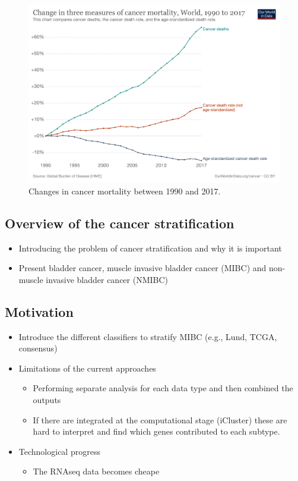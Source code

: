 \begin{figure}[!htb]
    \centering\includegraphics[width=1.0\textwidth,height=0.3\textheight,keepaspectratio]{Images/cancer-deaths-rate-and-age-standardized-rate-index.png}
      \caption{Changes in cancer mortality between 1990 and 2017. \cite{World_in_Data_undated-gc}}
      \label{fig:cancer_death}
  \end{figure}
  \FloatBarrier


\newpage

\subsection{Overview of the cancer stratification}

\begin{itemize}
    \item Introducing the problem of cancer stratification and why it is important
    \item Present bladder cancer, muscle invasive bladder cancer (MIBC) and non-muscle invasive bladder cancer (NMIBC)
\end{itemize}

\subsection{Motivation}

\begin{itemize}
    \item Introduce the different classifiers to stratify MIBC (e.g., Lund, TCGA, consensus)
    \item Limitations of the current approaches
    \begin{itemize}
        \item Performing separate analysis for each data type and then combined the outputs 
        \item If there are integrated at the computational stage (iCluster) these are hard to interpret and find which genes contributed to each subtype.
    \end{itemize}
    \item Technological progress    
    \begin{itemize}
        \item The RNAseq data becomes cheape
    \end{itemize}
\end{itemize}


